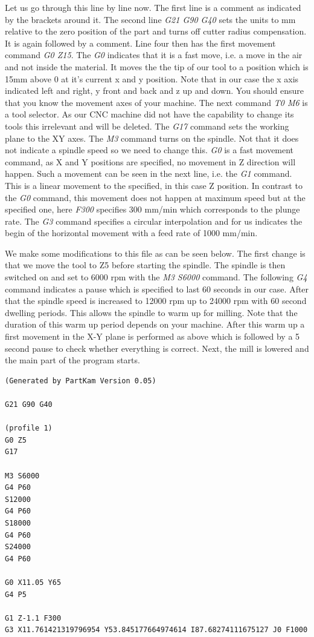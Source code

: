 \documentclass{article}
\begin{document}
Let us go through this line by line now. The first line is a comment as indicated by the brackets around it. The second line \textit{G21 G90 G40} sets the units to mm relative to the zero position of the part and turns off cutter radius compensation. It is again followed by a comment. Line four then has the first movement command \textit{G0 Z15}. The \textit{G0} indicates that it is a fast move, i.e. a move in the air and not inside the material. It moves the the tip of our tool to a position which is 15mm above 0 at it's current x and y position. Note that in our case the x axis indicated left and right, y front and back and z up and down. You should ensure that you know the movement axes of your machine. The next command \textit{T0 M6} is a tool selector. As our CNC machine did not have the capability to change its tools this irrelevant and will be deleted. The \textit{G17} command sets the working plane to the XY axes. The \textit{M3} command turns on the spindle. Not that it does not indicate a spindle speed so we need to change this. \textit{G0} is a fast movement command, as X and Y positions are specified, no movement in Z direction will happen. Such a movement can be seen in the next line, i.e. the \textit{G1} command. This is a linear movement to the specified, in this case Z position. In contrast to the \textit{G0} command, this movement does not happen at maximum speed but at the specified one, here \textit{F300} specifies 300 mm/min which corresponds to the plunge rate. The \textit{G3} command specifies a circular interpolation and for us indicates the begin of the horizontal movement with a feed rate of 1000 mm/min.

We make some modifications to this file as can be seen below. The first change is that we move the tool to Z5 before starting the spindle. The spindle is then switched on and set to 6000 rpm with the \textit{M3 S6000} command. The following \textit{G4} command indicates a pause which is specified to last 60 seconds in our case. After that the spindle speed is increased to 12000 rpm up to 24000 rpm with 60 second dwelling periods. This allows the spindle to warm up for milling. Note that the duration of this warm up period depends on your machine. After this warm up a first movement in the X-Y plane is performed as above which is followed by a 5 second pause to check whether everything is correct. Next, the mill is lowered and the main part of the program starts.

\begin{verbatim}
(Generated by PartKam Version 0.05)

G21 G90 G40

(profile 1)
G0 Z5
G17

M3 S6000
G4 P60
S12000
G4 P60
S18000
G4 P60
S24000
G4 P60

G0 X11.05 Y65
G4 P5

G1 Z-1.1 F300
G3 X11.761421319796954 Y53.845177664974614 I87.68274111675127 J0 F1000
\end{verbatim}
\end{document}
